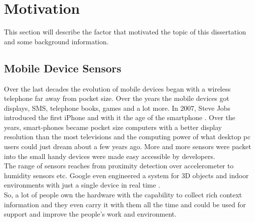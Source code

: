 \section{Motivation}
This section will describe the factor that motivated the topic of this dissertation and some background information. 

\subsection{Mobile Device Sensors}
Over the last decades the evolution of mobile devices began with a wireless telephone far away from pocket size. Over the years the mobile devices got displays, SMS, telephone books, games and a lot more. In 2007, Steve Jobs introduced the first iPhone and with it the age of the smartphone  \cite{laugesen2010factors}. Over the years, smart-phones became pocket size computers with a better display resolution than the most televisions and the computing power of what desktop pc users could just dream about a few years ago. More and more sensors were packet into the small handy devices were made easy accessible by developers.\\
The range of sensors reaches from proximity detection over accelerometer to humidity sensors etc. Google even engineered a system for 3D objects and indoor environments with just a single device in real time \cite{schops20153d}.\\
So, a lot of people own the hardware with the capability to collect rich context information and they even carry it with them all the time and could be used for support and improve the people's work and environment.

